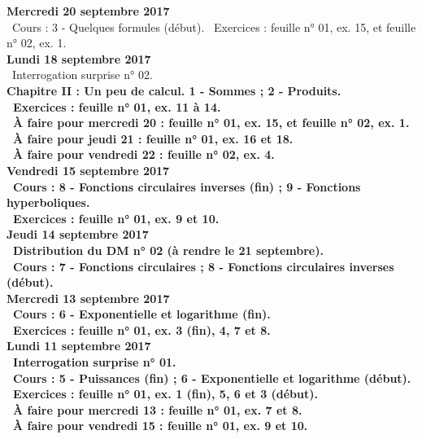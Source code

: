 \documentclass[12pt,a4paper]{article}
\begin{document}
\noindent\textbf{\bf Mercredi 20 septembre 2017}\\
\bu\ Cours : 3 - Quelques formules (début).
\bu\ Exercices : feuille n° 01, ex. 15, et feuille n° 02, ex. 1.\vspace{.4cm}\\

\noindent\textbf{\bf Lundi 18 septembre 2017}\\
\bu\ Interrogation surprise n° 02.\\
\bf Chapitre II \rm : Un peu de calcul. 1 - Sommes ; 2 - Produits.\\
\bu\ Exercices : feuille n° 01, ex. 11 à 14.\\
\bu\ À faire pour mercredi 20 : feuille n° 01, ex. 15, et feuille n° 02, ex. 1.\\
\bu\ À faire pour jeudi 21 : feuille n° 01, ex. 16 et 18.\\
\bu\ À faire pour vendredi 22 : feuille n° 02, ex. 4.\vspace{.4cm}\\

\noindent\textbf{Vendredi 15 septembre 2017}\\
\bu\ Cours : 8 - Fonctions circulaires inverses (fin) ; 9 - Fonctions hyperboliques.\\
\bu\ Exercices : feuille n° 01, ex. 9 et 10.\vspace{.4cm}\\

\noindent\textbf{\bf Jeudi 14 septembre 2017}\\
\bu\ Distribution du DM n° 02 (à rendre le 21 septembre).\\
\bu\ Cours : 7 - Fonctions circulaires ; 8 - Fonctions circulaires inverses (début).\vspace{.4cm}\\

\noindent\textbf{\bf Mercredi 13 septembre 2017}\\
\bu\ Cours : 6 - Exponentielle et logarithme (fin).\\
\bu\ Exercices : feuille n° 01, ex. 3 (fin), 4, 7 et 8.\vspace{.4cm}\\

\noindent\textbf{\bf Lundi 11 septembre 2017}\\
\bu\ Interrogation surprise n° 01.\\
\bu\ Cours : 5 - Puissances (fin) ; 6 - Exponentielle et logarithme (début).\\
\bu\ Exercices : feuille n° 01, ex. 1 (fin), 5, 6 et 3 (début).\\
\bu\ À faire pour mercredi 13 : feuille n° 01, ex. 7 et 8.\\
\bu\ À faire pour vendredi 15 : feuille n° 01, ex. 9 et 10.\vspace{.4cm}\\
\end{document}
